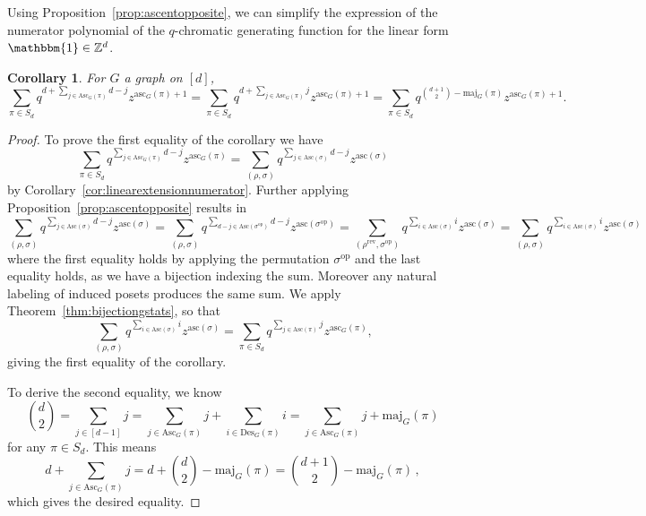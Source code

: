 \documentclass[11pt]{amsart}
\newtheorem{corollary}[theorem]{Corollary}
\newcommand{\maj}{\mathrm{maj}}
\newcommand{\des}{\mathrm{Des}}
\newcommand{\asc}{\mathrm{Asc}}
\newcommand{\ascnum}{\mathrm{asc}}
\newcommand{\rev}[1]{#1^{\mathrm{rev}}}
\newcommand{\op}[1]{#1^{\mathrm{op}}}
\begin{document}
Using Proposition~\ref{prop:ascentopposite}, we can simplify the expression of the numerator polynomial of the $q$-chromatic generating function for the linear form $\mathbbm{1} \in \mathbb{Z}^d$.
\begin{corollary}\label{cor:qznumeratorsymmetry}
    For $G$ a graph on $[d]$,
    \[
        \sum_{\pi \in S_d} q^{d + \sum_{j \in \asc_G(\pi)} d-j} z^{\ascnum_G(\pi) +1} = \sum_{\pi \in S_d} q^{d + \sum_{j \in \asc_G(\pi)} j} z^{\ascnum_G(\pi) +1} = \sum_{\pi \in S_d} q^{\binom{d+1}{2} - \maj_G(\pi)} z^{\ascnum_G(\pi) +1} .
    \]
\end{corollary}
\begin{proof}
    To prove the first equality of the corollary we have 
    \[
        \sum_{\pi \in S_d} q^{\sum_{j \in \asc_G(\pi)} d-j} z^{\ascnum_G(\pi)}= \sum_{(\rho,\sigma)} q^{\sum_{j \in \asc(\sigma)} d-j} z^{\ascnum(\sigma)}
    \] 
    by Corollary~\ref{cor:linearextensionnumerator}.
    Further applying Proposition~\ref{prop:ascentopposite} results in
    \[
        \sum_{(\rho,\sigma)} q^{\sum_{j \in \asc(\sigma)} d-j} z^{\ascnum(\sigma)} = \sum_{(\rho,\sigma)} q^{\sum_{d-j \in \asc(\op{\sigma})} d-j} z^{\ascnum(\op{\sigma})} = \sum_{(\rev{\rho},\op{\sigma})} q^{\sum_{i \in \asc({\sigma})} i} z^{\ascnum({\sigma})} = \sum_{(\rho,\sigma)} q^{\sum_{i \in \asc({\sigma})} i} z^{\ascnum({\sigma})}
    \]
    where the first equality holds by applying the permutation $\op{\sigma}$ and the last equality holds, as we have a bijection indexing the sum.
    Moreover any natural labeling of induced posets produces the same sum.
    We apply Theorem~\ref{thm:bijectiongstats}, so that 
    \[
        \sum_{(\rho,\sigma)} q^{\sum_{i \in \asc({\sigma})} i} z^{\ascnum({\sigma})} = \sum_{\pi \in S_d}
q^{\sum_{j \in \asc(\pi)} j} z^{\ascnum_G(\pi)} ,
    \]
    giving the first equality of the corollary.

    To derive the second equality, we know 
    \[
        \binom{d}{2} = \sum_{j \in [d-1]} j = \sum_{j \in \asc_G(\pi)} j + \sum_{i \in \des_G(\pi)} i  = \sum_{j \in \asc_G(\pi)} j + \maj_G(\pi)
    \]
    for any $\pi \in S_d$. This means
    \[
        d + \sum_{j \in \asc_G(\pi)} j = d + \binom{d}{2} - \maj_G(\pi) = \binom{d+1}{2} - \maj_G(\pi) \, ,
    \]
    which gives the desired equality.
\end{proof}
\end{document}
